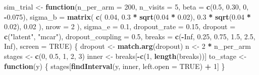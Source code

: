 \documentclass[
  11pt,
]{article}
\newenvironment{Shaded}{\begin{snugshade}}{\end{snugshade}}
\newcommand{\AttributeTok}[1]{\textcolor[rgb]{0.13,0.29,0.53}{#1}}
\newcommand{\ConstantTok}[1]{\textcolor[rgb]{0.56,0.35,0.01}{#1}}
\newcommand{\ControlFlowTok}[1]{\textcolor[rgb]{0.13,0.29,0.53}{\textbf{#1}}}
\newcommand{\DecValTok}[1]{\textcolor[rgb]{0.00,0.00,0.81}{#1}}
\newcommand{\FloatTok}[1]{\textcolor[rgb]{0.00,0.00,0.81}{#1}}
\newcommand{\FunctionTok}[1]{\textcolor[rgb]{0.13,0.29,0.53}{\textbf{#1}}}
\newcommand{\NormalTok}[1]{#1}
\newcommand{\OtherTok}[1]{\textcolor[rgb]{0.56,0.35,0.01}{#1}}
\newcommand{\SpecialCharTok}[1]{\textcolor[rgb]{0.81,0.36,0.00}{\textbf{#1}}}
\newcommand{\StringTok}[1]{\textcolor[rgb]{0.31,0.60,0.02}{#1}}
\begin{document}
\begin{Shaded}
\begin{Highlighting}[]
\NormalTok{sim\_trial }\OtherTok{\textless{}{-}} \ControlFlowTok{function}\NormalTok{(}\AttributeTok{n\_per\_arm =} \DecValTok{200}\NormalTok{,}
                      \AttributeTok{n\_visits =} \DecValTok{5}\NormalTok{,}
                      \AttributeTok{beta =} \FunctionTok{c}\NormalTok{(}\FloatTok{0.5}\NormalTok{, }\FloatTok{0.30}\NormalTok{, }\DecValTok{0}\NormalTok{, }\SpecialCharTok{{-}}\FloatTok{0.075}\NormalTok{),}
                      \AttributeTok{sigma\_b =} \FunctionTok{matrix}\NormalTok{(}
                        \FunctionTok{c}\NormalTok{(}
                          \FloatTok{0.04}\NormalTok{,}
                          \FloatTok{0.3} \SpecialCharTok{*} \FunctionTok{sqrt}\NormalTok{(}\FloatTok{0.04} \SpecialCharTok{*} \FloatTok{0.02}\NormalTok{),}
                          \FloatTok{0.3} \SpecialCharTok{*} \FunctionTok{sqrt}\NormalTok{(}\FloatTok{0.04} \SpecialCharTok{*} \FloatTok{0.02}\NormalTok{),}
                          \FloatTok{0.02}
\NormalTok{                        ),}
                        \AttributeTok{nrow =} \DecValTok{2}
\NormalTok{                      ),}
                      \AttributeTok{sigma\_e =} \FloatTok{0.1}\NormalTok{,}
                      \AttributeTok{dropout\_rate =} \FloatTok{0.15}\NormalTok{,}
                      \AttributeTok{dropout =} \FunctionTok{c}\NormalTok{(}\StringTok{"latent"}\NormalTok{, }\StringTok{"mcar"}\NormalTok{),}
                      \AttributeTok{dropout\_coupling =} \FloatTok{0.5}\NormalTok{,}
                      \AttributeTok{breaks =} \FunctionTok{c}\NormalTok{(}\SpecialCharTok{{-}}\ConstantTok{Inf}\NormalTok{, }\FloatTok{0.25}\NormalTok{, }\FloatTok{0.75}\NormalTok{, }\FloatTok{1.5}\NormalTok{, }\FloatTok{2.5}\NormalTok{, }\ConstantTok{Inf}\NormalTok{),}
                      \AttributeTok{screen =} \ConstantTok{TRUE}\NormalTok{) \{}
\NormalTok{  dropout }\OtherTok{\textless{}{-}} \FunctionTok{match.arg}\NormalTok{(dropout)}
\NormalTok{  n }\OtherTok{\textless{}{-}} \DecValTok{2} \SpecialCharTok{*}\NormalTok{ n\_per\_arm}
\NormalTok{  stages }\OtherTok{\textless{}{-}} \FunctionTok{c}\NormalTok{(}\DecValTok{0}\NormalTok{, }\FloatTok{0.5}\NormalTok{, }\DecValTok{1}\NormalTok{, }\DecValTok{2}\NormalTok{, }\DecValTok{3}\NormalTok{)}
\NormalTok{  inner }\OtherTok{\textless{}{-}}\NormalTok{ breaks[}\SpecialCharTok{{-}}\FunctionTok{c}\NormalTok{(}\DecValTok{1}\NormalTok{, }\FunctionTok{length}\NormalTok{(breaks))]}
\NormalTok{  to\_stage }\OtherTok{\textless{}{-}} \ControlFlowTok{function}\NormalTok{(y) \{}
\NormalTok{    stages[}\FunctionTok{findInterval}\NormalTok{(y, inner, }\AttributeTok{left.open =} \ConstantTok{TRUE}\NormalTok{) }\SpecialCharTok{+} \DecValTok{1}\NormalTok{]}
\NormalTok{  \}}


\end{Highlighting}
\end{Shaded}
\end{document}
